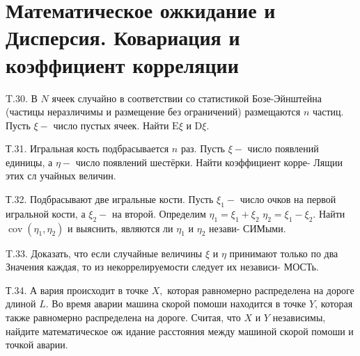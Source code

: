 \documentclass[a4paper,12pt]{article} %
\begin{document}
\section{Математическое ожкидание и Дисперсия. Ковариация и коэффициент корреляции}


\begin{example}

T.30. В $N$ ячеек случайно в соответствии со статистикой Бозе-Эйнштейна (частицы неразличимы и размещение без ограничений) размещаются $n$ частиц. Пусть $\xi-$ число пустых ячеек. Найти $\mathrm{E} \xi$ и $\mathrm{D} \xi$.




\end{example}







\begin{example}


Т.31. Игральная кость подбрасывается $n$ раз. Пусть $\xi-$ число появлений единицы, а $\eta-$ число появлений шестёрки. Найти коэффициент корре-
Лящии этих сл учайных величин.



\end{example}



\begin{example}


Т.32. Подбрасывают две игральные кости. Пусть $\xi_{1}-$ число очков на первой игральной кости, а $\xi_{2}-$ на второй. Определим $\eta_{1}=\xi_{1}+\xi_{2}$ $\eta_{2}=\xi_{1}-\xi_{2} .$ Найти $\operatorname{cov}\left(\eta_{1}, \eta_{2}\right)$ и выяснить, являются ли $\eta_{1}$ и $\eta_{2}$ незави-
СИМыми.



\end{example}



\begin{example}

T.33. Доказать, что если случайные величины $\xi$ и $\eta$ принимают только
по два Значения каждая, то из некоррелируемости следует их независи-
МОСТь.




\end{example}





\begin{example}


Т.34. А вария происходит в точке $X,$ которая равномерно распределена на дороге длиной $L .$ Во время аварии машина скорой помоши находится в точке $Y$, которая также равномерно распределена на дороге. Считая,
что $X$ и $Y$ независимы, найдите математическое ож идание расстояния между машиной скорой помоши и точкой аварии.



\end{example}
\end{document}
